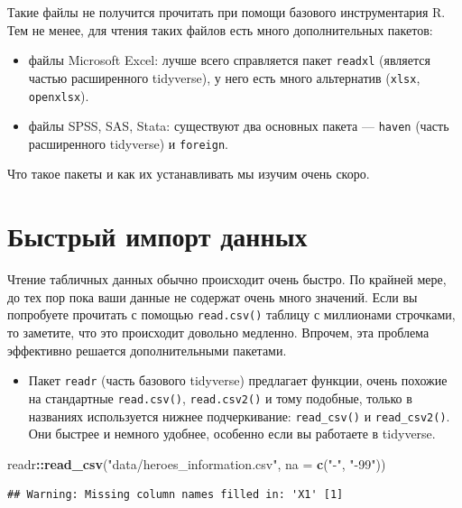 \documentclass[
]{book}
\newenvironment{Shaded}{\begin{snugshade}}{\end{snugshade}}
\newcommand{\DataTypeTok}[1]{\textcolor[rgb]{0.13,0.29,0.53}{#1}}
\newcommand{\KeywordTok}[1]{\textcolor[rgb]{0.13,0.29,0.53}{\textbf{#1}}}
\newcommand{\NormalTok}[1]{#1}
\newcommand{\OperatorTok}[1]{\textcolor[rgb]{0.81,0.36,0.00}{\textbf{#1}}}
\newcommand{\StringTok}[1]{\textcolor[rgb]{0.31,0.60,0.02}{#1}}
\providecommand{\tightlist}{%
  \setlength{\itemsep}{0pt}\setlength{\parskip}{0pt}}
\begin{document}
Такие файлы не получится прочитать при помощи базового инструментария R. Тем не менее, для чтения таких файлов есть много дополнительных пакетов:

\begin{itemize}
\item
  файлы Microsoft Excel: лучше всего справляется пакет \texttt{readxl} (является частью расширенного tidyverse), у него есть много альтернатив (\texttt{xlsx}, \texttt{openxlsx}).
\item
  файлы SPSS, SAS, Stata: существуют два основных пакета --- \texttt{haven} (часть расширенного tidyverse) и \texttt{foreign}.
\end{itemize}

Что такое пакеты и как их устанавливать мы изучим очень скоро.

\hypertarget{fastread}{%
\section{Быстрый импорт данных}\label{fastread}}

Чтение табличных данных обычно происходит очень быстро. По крайней мере, до тех пор пока ваши данные не содержат очень много значений. Если вы попробуете прочитать с помощью \texttt{read.csv()} таблицу с миллионами строчками, то заметите, что это происходит довольно медленно. Впрочем, эта проблема эффективно решается дополнительными пакетами.

\begin{itemize}
\tightlist
\item
  Пакет \texttt{readr} (часть базового tidyverse) предлагает функции, очень похожие на стандартные \texttt{read.csv()}, \texttt{read.csv2()} и тому подобные, только в названиях используется нижнее подчеркивание: \texttt{read\_csv()} и \texttt{read\_csv2()}. Они быстрее и немного удобнее, особенно если вы работаете в tidyverse.
\end{itemize}

\begin{Shaded}
\begin{Highlighting}[]
\NormalTok{readr}\OperatorTok{::}\KeywordTok{read_csv}\NormalTok{(}\StringTok{"data/heroes_information.csv"}\NormalTok{,}
         \DataTypeTok{na =} \KeywordTok{c}\NormalTok{(}\StringTok{"-"}\NormalTok{, }\StringTok{"-99"}\NormalTok{))}
\end{Highlighting}
\end{Shaded}

\begin{verbatim}
## Warning: Missing column names filled in: 'X1' [1]
\end{verbatim}
\end{document}
